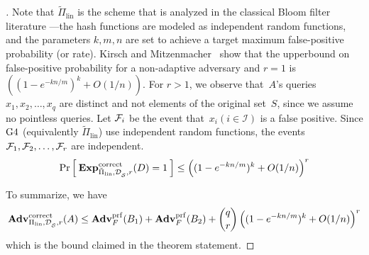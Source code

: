 \begin{proof}[]
Note that $\tilde{\Pi}_{\mathrm{lin}}$ is the scheme that is analyzed in the classical Bloom filter literature ---the hash functions are modeled as independent random functions, and the parameters $k,m,n$  are set to achieve a target maximum false-positive probability (or rate).  Kirsch and Mitzenmacher~\cite{KM} show that the upperbound on false-positive probability for a non-adaptive adversary and $r=1$ is $\left( (1-e^{-kn/m})^k + O(1/n) \right)$.  For $r>1$, we observe that~$A$'s queries $x_1,x_2,\ldots,x_q$ are distinct and not elements of the original set~$S$, since we assume no pointless queries. Let ${\cal F}_i$ be the event that~$x_i(i \in \mathcal{I})$ is a false positive.  Since $\text{G4}$ (equivalently $\tilde{\Pi}_{\mathrm{lin}}$) use independent random functions, the events ${\cal F}_1,{\cal F}_2,\ldots,{\cal F}_r$ are independent. 
\[
\Pr\left[\: \mathrm{\mathbf{Exp}}^{\mathrm{correct}}_{\tilde{\Pi}_{\mathrm{lin}},\mathcal{D}_{{\cal S}}^{},r}(D) = 1 \:\right]\leq \left( (1-e^{-kn/m})^k + O(1/n) \right)^r 
\]

To summarize, we have 
\[
\mathrm{\mathbf{Adv}}^{\mathrm{correct}}_{\Pi_{\mathrm{lin}},\mathcal{D}_{{\cal S}}^{},r}(A)  \leq  \mathbf{Adv}^{\mathrm{prf}}_{F}(B_1) +\mathbf{Adv}^{\mathrm{prf}}_{F}(B_2) +\dbinom{q}{r}\left( (1-e^{-kn/m})^k + O(1/n) \right)^r
\]
which is the bound claimed in the theorem statement. %


\end{proof}
